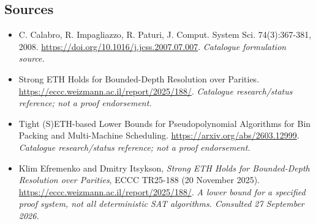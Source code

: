 \documentclass[11pt,a4paper]{article}
\numberwithin{equation}{section}
\begin{document}
\subsection{Sources}
\begin{itemize}\raggedright
\item[\textnormal{[S1]}]\hypertarget{source:65:1}{} C. Calabro, R. Impagliazzo, R. Paturi, J. Comput. System Sci. 74(3):367-381, 2008.
\url{https://doi.org/10.1016/j.jcss.2007.07.007}.
{\small\textit{Catalogue formulation source.}}
\item[\textnormal{[S2]}]\hypertarget{source:65:2}{} Strong ETH Holds for Bounded-Depth Resolution over Parities.
\url{https://eccc.weizmann.ac.il/report/2025/188/}.
{\small\textit{Catalogue research/status reference; not a proof endorsement.}}
\item[\textnormal{[S3]}]\hypertarget{source:65:3}{} Tight (S)ETH-based Lower Bounds for Pseudopolynomial Algorithms for Bin Packing and Multi-Machine Scheduling.
\url{https://arxiv.org/abs/2603.12999}.
{\small\textit{Catalogue research/status reference; not a proof endorsement.}}

\item[\textnormal{[E1]}]\hypertarget{extra:65:1}{} Klim Efremenko and Dmitry Itsykson, \emph{Strong ETH Holds for Bounded-Depth Resolution over Parities}, ECCC TR25-188 (20 November 2025).
\url{https://eccc.weizmann.ac.il/report/2025/188/}.
{\small\textit{A lower bound for a specified proof system, not all deterministic SAT algorithms. Consulted 27 September 2026.}}
\end{itemize}
\end{document}
